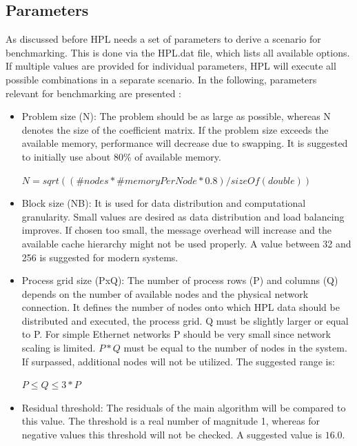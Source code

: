 \documentclass[10pt,twocolumn]{article}
\begin{document}
\subsection{Parameters}
As discussed before HPL needs a set of parameters to derive a scenario for benchmarking. This is done via the HPL.dat file, which lists all available options. If multiple values are provided for individual parameters, HPL will execute all possible combinations in a separate scenario. In the following, parameters relevant for benchmarking are presented \cite{HPLtuning, HPLexplained}:

\begin{itemize}

\item Problem size (N): The problem should be as large as possible, whereas N denotes the size of the coefficient matrix. If the problem size exceeds the available memory, performance will decrease due to swapping. It is suggested to initially use about 80\% of available memory.
\begin{center}
$ N = sqrt ( ( \#nodes * \#memoryPerNode * 0.8 ) / sizeOf(double) )$
\end{center}

\item Block size (NB): It is used for data distribution and computational granularity. Small values are desired as data distribution and load balancing improves. If chosen too small, the message overhead will increase and the available cache hierarchy might not be used properly. A value between 32 and 256 is suggested for modern systems.

\item Process grid size (PxQ): The number of process rows (P) and columns (Q) depends on the number of available nodes and the physical network connection. It defines the number of nodes onto which HPL data should be distributed and executed, the process grid. Q must be slightly larger or equal to P. For simple Ethernet networks P should be very small since network scaling is limited. $P*Q$ must be equal to the number of nodes in the system. If surpassed, additional nodes will not be utilized. The suggested range is:
\begin{center}
$P \leq Q \leq 3*P$	
\end{center}

\item Residual threshold: The residuals of the main algorithm will be compared to this value. The threshold is a real number of magnitude 1, whereas for negative values this threshold will not be checked. A suggested value is $16.0$.


\end{itemize}
\end{document}
